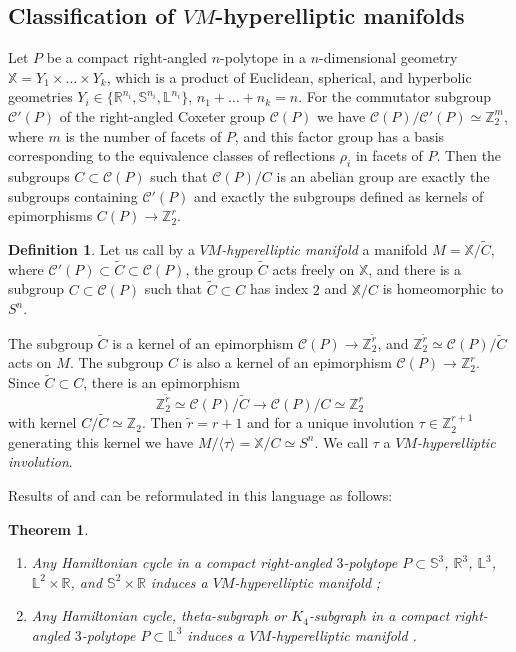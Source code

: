 \documentclass[12pt]{amsart}
\newtheorem{theorem}[formula]{Theorem}
\theoremstyle{definition}
\newtheorem{definition}[formula]{Definition}
\theoremstyle{remark}
\begin{document}
\subsection{Classification of $VM$-hyperelliptic manifolds}
Let $P$ be a compact right-angled $n$-polytope in a $n$-dimensional geometry $\mathbb X=Y_1\times\dots\times Y_k$, 
 which is a product of  Euclidean, spherical, and hyperbolic geometries 
$Y_i\in\{\mathbb R^{n_i},\mathbb S^{n_i},\mathbb L^{n_i}\}$, $n_1+\dots+n_k=n$. 
For the commutator subgroup $\mathcal{C}'(P)$ of the right-angled Coxeter group $\mathcal{C}(P)$ we have 
$\mathcal{C}(P)/\mathcal{C}'(P)\simeq\mathbb Z_2^m$, where $m$ is the number of facets of $P$, and 
this factor group has a basis corresponding to the equivalence classes of reflections $\rho_i$
in facets of $P$. Then the subgroups $C\subset\mathcal{C}(P)$ such that $\mathcal{C}(P)/C$ is an abelian group
are exactly the subgroups containing $\mathcal{C}'(P)$ and exactly the subgroups defined as 
kernels of epimorphisms $C(P)\to\mathbb Z_2^r$. 
\begin{definition}
Let us call by a  {\it $VM$-hyperelliptic manifold} a manifold $M=\mathbb X/\widetilde{C}$, 
where $\mathcal{C}'(P)\subset \widetilde{C}\subset\mathcal{C}(P)$, the group  $\widetilde{C}$ acts freely on $\mathbb X$,
and there is a subgroup $C\subset \mathcal{C}(P)$ such that $\widetilde{C}\subset C$ has index $2$
and $\mathbb X/C$ is homeomorphic to~$S^n$.
\end{definition}
The subgroup $\widetilde{C}$ is a kernel of an epimorphism $\mathcal{C}(P)\to\mathbb Z_2^{\widetilde{r}}$, and 
$\mathbb Z_2^{\widetilde{r}}\simeq \mathcal{C}(P)/\widetilde{C}$ acts on $M$. The subgroup $C$ is also a kernel of an epimorphism 
$\mathcal{C}(P)\to\mathbb Z_2^{r}$. Since $\widetilde{C}\subset C$, there is an epimorphism 
$$
\mathbb Z_2^{\widetilde{r}}\simeq \mathcal{C}(P)/\widetilde{C}\to  \mathcal{C}(P)/C\simeq \mathbb Z_2^{r}
$$ 
with kernel $C/\widetilde{C}\simeq\mathbb Z_2$.  Then $\widetilde{r}=r+1$ and for a unique involution $\tau\in\mathbb Z_2^{r+1}$ 
generating this kernel we have $M/\langle\tau\rangle=\mathbb X/C\simeq S^n$. 
We call $\tau$ a {\it $VM$-hyperelliptic involution}.

Results of \cite{M90}  and \cite{VM99S2} can be reformulated in this language as follows: 
\begin{theorem}
\begin{enumerate}
\item Any Hamiltonian cycle in a compact right-angled $3$-polytope $P\subset\mathbb  S^3$, $\mathbb R^3$, $\mathbb L^3$, 
$\mathbb L^2\times \mathbb R$, and $\mathbb S^2\times\mathbb R$ induces  a $VM$-hyperelliptic manifold  \cite{M90};
\item Any Hamiltonian cycle, theta-subgraph or $K_4$-subgraph in a compact right-angled $3$-polytope 
$P\subset\mathbb L^3 $ induces a $VM$-hyperelliptic manifold \cite{VM99S2}.
\end{enumerate}
\end{theorem}
\end{document}
